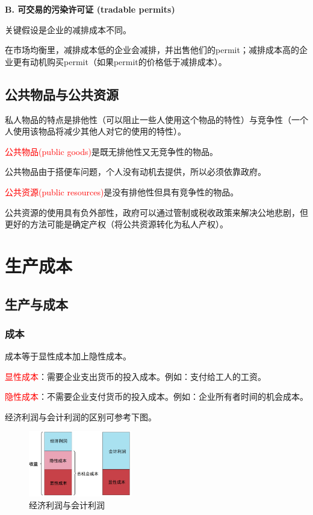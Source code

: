 \documentclass[12pt, a4paper]{article}
\begin{document}
\textbf{B. 可交易的污染许可证 (tradable permits)}

关键假设是企业的减排成本不同。

在市场均衡里，减排成本低的企业会减排，并出售他们的permit；减排成本高的企业更有动机购买permit（如果permit的价格低于减排成本）。

\subsection{公共物品与公共资源}
私人物品的特点是排他性（可以阻止一些人使用这个物品的特性）与竞争性（一个人使用该物品将减少其他人对它的使用的特性）。

\textcolor{red}{公共物品(public goods)}是既无排他性又无竞争性的物品。

公共物品由于搭便车问题，个人没有动机去提供，所以必须依靠政府。

\textcolor{red}{公共资源(public resources)}是没有排他性但具有竞争性的物品。

公共资源的使用具有负外部性，政府可以通过管制或税收政策来解决公地悲剧，但更好的方法可能是确定产权（将公共资源转化为私人产权）。


\newpage
\section{生产成本}

\subsection{生产与成本}
\subsubsection{成本}
成本等于显性成本加上隐性成本。

\textcolor{red}{显性成本}：需要企业支出货币的投入成本。例如：支付给工人的工资。

\textcolor{red}{隐性成本}：不需要企业支付货币的投入成本。例如：企业所有者时间的机会成本。

经济利润与会计利润的区别可参考下图。

\begin{figure}[H]
  \centering
  \includegraphics[width=0.4\textwidth]{经济利润与会计利润.png}
  \caption{经济利润与会计利润}
\end{figure}
\end{document}
